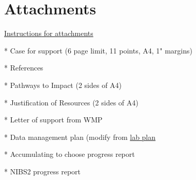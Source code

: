 \documentclass[11pt, a4paper]{article}
\begin{document}
\section{Attachments}

\href{https://je-s.rcuk.ac.uk/Handbook/Index.htm#pages/GuidanceonCompletingaStandardG/CaseforSupportandAttachments/ESRCSpecificRequirements.htm}{Instructions for attachments}

* Case for support (6 page limit, 11 points, A4, 1" margins) 

* References

* Pathways to Impact (2 sides of A4) 

* Justification of Resources (2 sides of A4)

* Letter of support from WMP

* Data management plan (modify from \href{https://github.com/neil-stewart/data_management_plan}{lab plan}


* Accumulating to choose progress report

* NIBS2 progress report



\newpage



\end{document}
